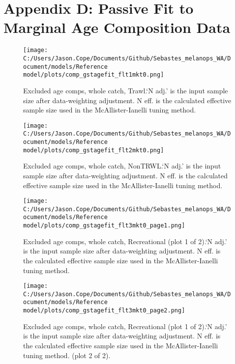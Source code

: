 \documentclass[11pt,
  english,
  letterpaper,
]{article}
\begin{document}
\clearpage

\hypertarget{app-d}{%
\section{Appendix D: Passive Fit to Marginal Age Composition Data}\label{app-d}}

\begin{figure}
\centering
\texttt{[image: C:/Users/Jason.Cope/Documents/Github/Sebastes\_melanops\_WA/Document/models/Reference model/plots/comp\_gstagefit\_flt1mkt0.png]}
\caption{Excluded age comps, whole catch, Trawl.`N adj.' is the input sample size after data-weighting adjustment. N eff. is the calculated effective sample size used in the McAllister-Ianelli tuning method.\label{fig:comp_gstagefit_flt1mkt0}}
\end{figure}

\begin{figure}
\centering
\texttt{[image: C:/Users/Jason.Cope/Documents/Github/Sebastes\_melanops\_WA/Document/models/Reference model/plots/comp\_gstagefit\_flt2mkt0.png]}
\caption{Excluded age comps, whole catch, NonTRWL.`N adj.' is the input sample size after data-weighting adjustment. N eff. is the calculated effective sample size used in the McAllister-Ianelli tuning method.\label{fig:comp_gstagefit_flt2mkt0}}
\end{figure}

\begin{figure}
\centering
\texttt{[image: C:/Users/Jason.Cope/Documents/Github/Sebastes\_melanops\_WA/Document/models/Reference model/plots/comp\_gstagefit\_flt3mkt0\_page1.png]}
\caption{Excluded age comps, whole catch, Recreational (plot 1 of 2).`N adj.' is the input sample size after data-weighting adjustment. N eff. is the calculated effective sample size used in the McAllister-Ianelli tuning method.\label{fig:comp_gstagefit_flt3mkt0_page1}}
\end{figure}

\begin{figure}
\centering
\texttt{[image: C:/Users/Jason.Cope/Documents/Github/Sebastes\_melanops\_WA/Document/models/Reference model/plots/comp\_gstagefit\_flt3mkt0\_page2.png]}
\caption{Excluded age comps, whole catch, Recreational (plot 1 of 2).`N adj.' is the input sample size after data-weighting adjustment. N eff. is the calculated effective sample size used in the McAllister-Ianelli tuning method. (plot 2 of 2).\label{fig:comp_gstagefit_flt3mkt0_page2}}
\end{figure}
\end{document}
